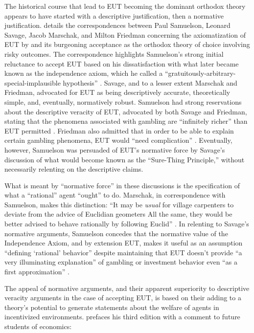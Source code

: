 \documentclass[../main.tex]{subfiles}
\begin{document}
The historical course that lead to EUT becoming the dominant orthodox theory appears to have started with a descriptive justification, then a normative justification.
\textcite{Moscati2016} details the correspondences between Paul Samuelson, Leonard Savage, Jacob Marschak, and Milton Friedman concerning the axiomatization of EUT by \textcite{VonNeumann1944} and its burgeoning acceptance as the orthodox theory of choice involving risky outcomes.
The correspondence highlights Samuelson's strong initial reluctance to accept EUT based on his dissatisfaction with what later became known as the independence axiom, which he called a \enquote{gratuitously-arbitrary-special-implausible hypothesis} \parencite[225]{Moscati2016}.
Savage, and to a lesser extent Marschak and Friedman, advocated for EUT as being descriptively accurate, theoretically simple, and, eventually, normatively robust.
Samuelson had strong reservations about the descriptive veracity of EUT, advocated by both Savage and Friedman, stating that the phenomena associated with gambling are \enquote{infinitely richer} than EUT permitted \parencite[227]{Moscati2016}.
Friedman also admitted that in order to be able to explain certain gambling phenomena, EUT would \enquote{need complication} \parencite[229]{Moscati2016}.
Eventually, however, Samuelson was persuaded of EUT's normative force by Savage's discussion of what would become known as the \enquote{Sure-Thing Principle,} without necessarily relenting on the descriptive claims.

What is meant by \enquote{normative force} in these discussions is the specification of what a \enquote{rational} agent \enquote{ought} to do.
Marschak, in correspondence with Samuelson, makes this distinction:
\enquote{It may be \textit{usual} for village carpenters \textelp{} to deviate from the advice of Euclidian geometers \textelp{} All the same, they would be better advised to behave rationally by following Euclid} \parencite[229]{Moscati2016}.
In relenting to Savage's normative arguments, Samuelson concedes that the normative value of the Independence Axiom, and by extension EUT, makes it useful as an assumption \enquote{defining \enquote{rational} behavior} \parencite[231]{Moscati2016} despite maintaining that EUT doesn't provide \enquote{a very illuminating explanation} of gambling or investment behavior even \enquote{as a first approximation} \parencite[232]{Moscati2016}.

The appeal of normative arguments, and their apparent superiority to descriptive veracity arguments in the case of accepting EUT, is based on their adding to a theory's potential to generate statements about the welfare of agents in incentivized environments.
\textcite[preface to the third edition]{Pigou1929} prefaces his third edition with a comment to future students of economics:
\end{document}
